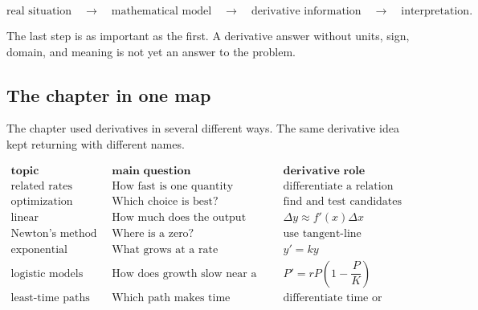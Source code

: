 \[
\text{real situation}
\quad\longrightarrow\quad
\text{mathematical model}
\quad\longrightarrow\quad
\text{derivative information}
\quad\longrightarrow\quad
\text{interpretation}.
\]

The last step is as important as the first.  A derivative answer without units, sign,
domain, and meaning is not yet an answer to the problem.

\subsection{The chapter in one map}
\label{subsec:chapter7-one-map}

The chapter used derivatives in several different ways.  The same derivative idea
kept returning with different names.

\[
\begin{array}{c|c|c}
\textbf{topic} & \textbf{main question} & \textbf{derivative role} \\ \hline
\text{related rates} & \text{How fast is one quantity changing?}
& \text{differentiate a relation} \\[4pt]
\text{optimization} & \text{Which choice is best?}
& \text{find and test candidates} \\[4pt]
\text{linear approximation} & \text{How much does the output change?}
& \Delta y\approx f'(x)\Delta x \\[4pt]
\text{Newton's method} & \text{Where is a zero?}
& \text{use tangent-line correction} \\[4pt]
\text{exponential models} & \text{What grows at a rate proportional to itself?}
& y'=ky \\[4pt]
\text{logistic models} & \text{How does growth slow near a limit?}
& P'=rP\left(1-\dfrac{P}{K}\right) \\[8pt]
\text{least-time paths} & \text{Which path makes time stationary?}
& \text{differentiate time or distance}
\end{array}
\]

